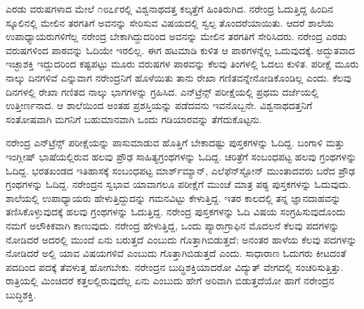 ಎರಡು ವರುಷಗಳಾದ ಮೇಲೆ ೧೮೭೯ರಲ್ಲಿ ವಿಶ್ವನಾಥದತ್ತ ಕಲ್ಕತ್ತೆಗೆ ಹಿಂತಿರುಗಿದ. ನರೇಂದ್ರ ಓದುತ್ತಿದ್ದ ಹಿಂದಿನ ಸ್ಕೂಲಿನಲ್ಲಿ ಮೇಲಿನ ತರಗತಿಗೆ ಅವನನ್ನು ಸೇರಿಸುವ ವಿಷಯದಲ್ಲಿ ಸ್ವಲ್ಪ ತೊಂದರೆಯಾಯಿತು. ಆದರೆ ಶಾಲೆಯ ಉಪಾಧ್ಯಾಯರುಗಳಿಗೆಲ್ಲ ನರೇಂದ್ರ ಬೇಕಾಗಿದ್ದುದರಿಂದ ಅವನನ್ನು ಮೇಲಿನ ತರಗತಿಗೆ ಸೇರಿಸಿದರು. ನರೇಂದ್ರ ಎರಡು ವರುಷಗಳಿಂದ ಪಾಠವನ್ನು ಓದಿಯೇ ಇರಲಿಲ್ಲ. ಈಗ ಹಟಮಾಡಿ ಕುಳಿತ ಆ ಪಾಠಗಳನ್ನೆಲ್ಲ ಒದುವುದಕ್ಕೆ. ಅದ್ಭುತವಾದ ಇಚ್ಛಾಶಕ್ತಿ ಇದ್ದುದರಿಂದ ಕಷ್ಟಪಟ್ಟು ಮೂರು ವರುಷಗಳ ಪಾಠವನ್ನು ಕೆಲವು ತಿಂಗಳಲ್ಲಿ ಓದಲು ಕುಳಿತ. ಪರೀಕ್ಷೆ ಮೂರು ನಾಲ್ಕು ದಿನಗಳಿವೆ ಎನ್ನುವಾಗ ನರೇಂದ್ರನಿಗೆ ಹೊಳೆಯಿತು ತಾನು ರೇಖಾ ಗಣಿತವನ್ನೇ\break ನೋಡಿಕೊಂಡಿಲ್ಲ ಎಂದು. ಕೆಲವು ದಿನಗಳಲ್ಲಿ ರೇಖಾ ಗಣಿತದ ನಾಲ್ಕು ಭಾಗಗಳನ್ನು ಗ್ರಹಿಸಿದ. ಎನ್‍ಟ್ರೆನ್ಸ್ ಪರೀಕ್ಷೆಯಲ್ಲಿ ಪ್ರಥಮ ದರ್ಜೆಯಲ್ಲಿ ಉತ್ತೀರ್ಣನಾದ. ಆ ಶಾಲೆಯಿಂದ ಅಂತಹ ಪ್ರಶಸ್ತಿಯನ್ನು ಪಡೆದವನು ಇವನೊಬ್ಬನೇ. ವಿಶ್ವನಾಥದತ್ತನಿಗೆ ಸಂತೋಷವಾಗಿ ಮಗನಿಗೆ ಬಹುಮಾನವಾಗಿ ಒಂದು ಗಡಿಯಾರವನ್ನು ತೆಗೆದುಕೊಟ್ಟನು.

ನರೇಂದ್ರ ಎನ್‍ಟ್ರೆನ್ಸ್ ಪರೀಕ್ಷೆಯನ್ನು ಪಾಸುಮಾಡುವ ಹೊತ್ತಿಗೆ ಬೇಕಾದಷ್ಟು ಪುಸ್ತಕಗಳನ್ನು ಓದಿದ್ದ. ಬಂಗಾಳಿ ಮತ್ತು ಇಂಗ್ಲೀಷ್ ಭಾಷೆಯಲ್ಲಿರುವ ಹಲವು ಪ್ರೌಢ ಸಾಹಿತ್ಯಗ್ರಂಥಗಳನ್ನು ಓದಿದ್ದ. ಚರಿತ್ರೆಗೆ ಸಂಬಂಧಪಟ್ಟ ಹಲವು ಗ್ರಂಥಗಳನ್ನು ಓದಿದ್ದ. ಭರತಖಂಡದ ಇತಿಹಾಸಕ್ಕೆ ಸಂಬಂಧಪಟ್ಟ ಮಾರ್ಶ್‍ಮ್ಯಾನ್, ಎಲೆಫೆನ್‍ಸ್ಟೋನ್ ಮುಂತಾದವರು ಬರೆದ ಪ್ರೌಢ ಗ್ರಂಥಗಳನ್ನು ಓದಿದ್ದ. ನರೇಂದ್ರನ ಸ್ವಭಾವ ಯಾವಾಗಲೂ ಪರೀಕ್ಷೆಗೆ ಮುಂಚೆ ಮಾತ್ರ ಪಠ್ಯ ಪುಸ್ತಕಗಳನ್ನು ಓದುವುದು. ಶಾಲೆಯಲ್ಲಿ ಉಪಾಧ್ಯಾಯರು ಹೇಳುತ್ತಿದ್ದುದನ್ನು ಗಮನವಿಟ್ಟು ಕೇಳುತ್ತಿದ್ದ. ಇತರ ಕಾಲದಲ್ಲಿ ತನ್ನ ಜ್ಞಾನದಾಹವನ್ನು ತಣಿಸಿಕೊಳ್ಳುವುದಕ್ಕೆ ಹಲವು ಗ್ರಂಥಗಳನ್ನು ಓದುತ್ತಿದ್ದ. ನರೇಂದ್ರ ಪುಸ್ತಕಗಳನ್ನು ಓದಿ ವಿಷಯ ಸಂಗ್ರಹಿಸುವುದೊಂದು ನಮಗೆ ಅಲೌಕಿಕವಾಗಿ ಕಾಣುವುದು. ನರೇಂದ್ರ ಹೇಳುತ್ತಿದ್ದ, ಒಂದು ಪ್ಯಾರಾಗ್ರಾಫಿನ ಮೊದಲನೆ ಕೆಲವು ಪದಗಳನ್ನು ನೋಡಿದರೆ ಅದರಲ್ಲಿ ಮುಂದೆ ಏನು ಬರುತ್ತದೆ ಎಂಬುದು ಗೊತ್ತಾಗಿಬಿಡುತ್ತದೆ; ಅನಂತರ ಹಾಳೆಯ ಕೆಲವು ಪದಗಳನ್ನು ನೋಡಿದರೆ ಅಲ್ಲಿ ಯಾವ ವಿಷಯಗಳಿವೆ ಎಂಬುದು ಗೊತ್ತಾಗಿಬಿಡುತ್ತದೆ ಎಂದು. ಸಾಧಾರಾಣ ಓದುಗರು ಕೀಟದಂತೆ ಪದದಿಂದ ಪದಕ್ಕೆ ತೆವಳುತ್ತ ಹೋಗಬೇಕು. ನರೇಂದ್ರನ ಬುದ್ಧಿಶಕ್ತಿಯಾದರೋ ವಿದ್ಯುತ್ ವೇಗದಲ್ಲಿ ಸಂಚರಿಸುತ್ತಿತ್ತು. ರಾತ್ರಿಯಲ್ಲಿ ಮಿಂಚಿದರೆ ಕತ್ತಲಲ್ಲಿರುವುದೆಲ್ಲ ಏನು ಎಂಬುದು ಹೇಗೆ ಅರಿವಾಗಿ ಬಿಡುತ್ತದೆಯೋ ಹಾಗೆ ನರೇಂದ್ರನ ಬುದ್ಧಿಶಕ್ತಿ.

